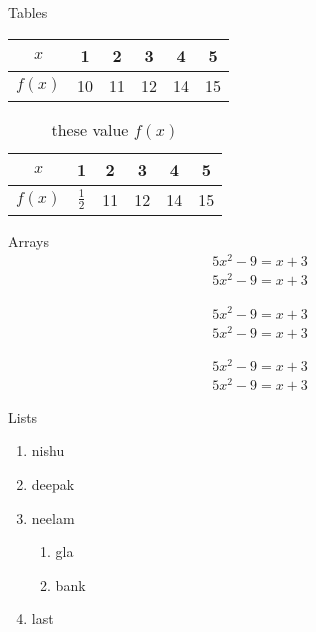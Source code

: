 \documentclass[]{article}
\begin{document}
Tables \\[6pt]

\begin{tabular}{|c|c|c|c|c|c|}
    \hline

    $ x $ & 1 & 2 & 3 & 4 & 5 \\ \hline
    $ f(x) $ & 10 & 11 & 12 & 14 & 15  \\ \hline


\end{tabular}

\vspace{2cm}

\begin{table}[H]
    
    \centering
    \def\arraystretch{1.5}

\begin{tabular}{|c|c|c|c|c|c|}
    \hline

    $ x $ & 1 & 2 & 3 & 4 & 5 \\ \hline
    $ f(x) $ & $ \frac{1}{2} $ & 11 & 12 & 14 & 15  \\ \hline


\end{tabular}

\caption{these value $ f(x) $}

\end{table}

Arrays \\[6pt]

\begin{align}
5x^2-9=x+3 \\
5x^2-9=x+3 
\end{align}

\begin{align*}
    5x^2-9=x+3 \\
    5x^2-9=x+3 
    \end{align*}

    \begin{align}
        5x^2-9=x+3 \\
        5x^2-9=x+3 
        \end{align}

 Lists \\[6pt]

 \begin{enumerate}
\item nishu
\item deepak
\item neelam
   \begin{enumerate}
    \item gla
    \item bank
   \end{enumerate}
\item last   
    
 \end{enumerate}
\end{document}
